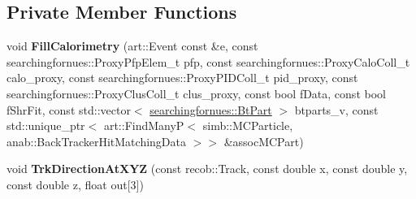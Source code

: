 \subsection*{Private Member Functions}
\begin{DoxyCompactItemize}
\item 
void {\bfseries Fill\+Calorimetry} (art\+::\+Event const \&e, const searchingfornues\+::\+Proxy\+Pfp\+Elem\+\_\+t pfp, const searchingfornues\+::\+Proxy\+Calo\+Coll\+\_\+t calo\+\_\+proxy, const searchingfornues\+::\+Proxy\+P\+I\+D\+Coll\+\_\+t pid\+\_\+proxy, const searchingfornues\+::\+Proxy\+Clus\+Coll\+\_\+t clus\+\_\+proxy, const bool f\+Data, const bool f\+Shr\+Fit, const std\+::vector$<$ \hyperlink{structsearchingfornues_1_1BtPart}{searchingfornues\+::\+Bt\+Part} $>$ btparts\+\_\+v, const std\+::unique\+\_\+ptr$<$ art\+::\+Find\+ManyP$<$ simb\+::\+M\+C\+Particle, anab\+::\+Back\+Tracker\+Hit\+Matching\+Data $>$$>$ \&assoc\+M\+C\+Part)\hypertarget{classanalysis_1_1CalorimetryAnalysis_af0f65a8080fbc0840646dcdd8761f806}{}\label{classanalysis_1_1CalorimetryAnalysis_af0f65a8080fbc0840646dcdd8761f806}

\item 
void {\bfseries Trk\+Direction\+At\+X\+YZ} (const recob\+::\+Track, const double x, const double y, const double z, float out\mbox{[}3\mbox{]})\hypertarget{classanalysis_1_1CalorimetryAnalysis_a9dda46fef9265f005050b3df5a5702c6}{}\label{classanalysis_1_1CalorimetryAnalysis_a9dda46fef9265f005050b3df5a5702c6}

\end{DoxyCompactItemize}
